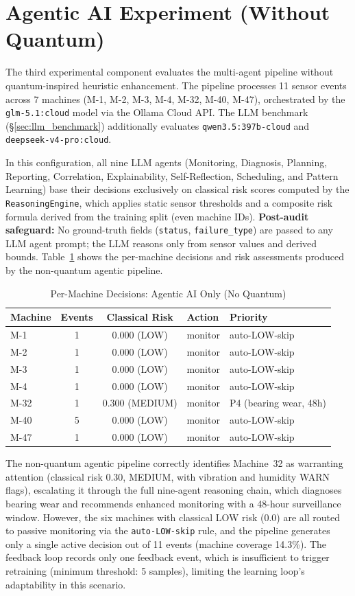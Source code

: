 \section{Agentic AI Experiment (Without Quantum)}

The third experimental component evaluates the multi-agent pipeline without quantum-inspired heuristic enhancement. The pipeline processes 11 sensor events across 7 machines (M-1, M-2, M-3, M-4, M-32, M-40, M-47), orchestrated by the \texttt{glm-5.1:cloud} model via the Ollama Cloud API. The LLM benchmark (\S\ref{sec:llm_benchmark}) additionally evaluates \texttt{qwen3.5:397b-cloud} and \texttt{deepseek-v4-pro:cloud}.

In this configuration, all nine LLM agents (Monitoring, Diagnosis, Planning, Reporting, Correlation, Explainability, Self-Reflection, Scheduling, and Pattern Learning) base their decisions exclusively on classical risk scores computed by the \texttt{ReasoningEngine}, which applies static sensor thresholds and a composite risk formula derived from the training split (even machine IDs). \textbf{Post-audit safeguard:} No ground-truth fields (\texttt{status}, \texttt{failure\_type}) are passed to any LLM agent prompt; the LLM reasons only from sensor values and derived bounds. Table~\ref{tab:agent_nq} shows the per-machine decisions and risk assessments produced by the non-quantum agentic pipeline.
\begin{table}[!htbp]
\centering
\caption{Per-Machine Decisions: Agentic AI Only (No Quantum)}
\label{tab:agent_nq}
\begin{tabular}{lccll}
\hline
\textbf{Machine} & \textbf{Events} & \textbf{Classical Risk} & \textbf{Action} & \textbf{Priority} \\
\hline
M-1  & 1 & 0.000 (LOW)    & monitor & auto-LOW-skip \\
M-2  & 1 & 0.000 (LOW)    & monitor & auto-LOW-skip \\
M-3  & 1 & 0.000 (LOW)    & monitor & auto-LOW-skip \\
M-4  & 1 & 0.000 (LOW)    & monitor & auto-LOW-skip \\
M-32 & 1 & 0.300 (MEDIUM) & monitor & P4 (bearing wear, 48h) \\
M-40 & 5 & 0.000 (LOW)    & monitor & auto-LOW-skip \\
M-47 & 1 & 0.000 (LOW)    & monitor & auto-LOW-skip \\
\hline
\end{tabular}
\end{table}
The non-quantum agentic pipeline correctly identifies Machine~32 as warranting attention (classical risk 0.30, MEDIUM, with vibration and humidity WARN flags), escalating it through the full nine-agent reasoning chain, which diagnoses bearing wear and recommends enhanced monitoring with a 48-hour surveillance window. However, the six machines with classical LOW risk (0.0) are all routed to passive monitoring via the \texttt{auto-LOW-skip} rule, and the pipeline generates only a single active decision out of 11 events (machine coverage 14.3\%). The feedback loop records only one feedback event, which is insufficient to trigger retraining (minimum threshold: 5 samples), limiting the learning loop's adaptability in this scenario.

